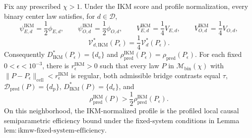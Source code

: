Fix any prescribed \(\chi>1\). Under the IKM score and profile normalization, every binary center law satisfies, for \(d\in\mathcal D\),
\[
 \psi_{E,d}^{\mathrm{IKM}}=\frac12\phi_{E,d},
 \qquad
 \psi_{O,d}^{\mathrm{IKM}}=\frac12\phi_{O,d},
 \qquad
 V_{E,d}^{\mathrm{IKM}}=\frac14V_{E,d},
 \qquad
 V_{O,d}^{\mathrm{IKM}}=\frac14V_{O,d},
\]
\[
 \mathcal V_{d,\mathrm{IKM}}^*(P_\epsilon)
 =\frac14\mathcal V_d^*(P_\epsilon).
\]
Consequently \(D_{\mathrm{IKM}}^*(P_\epsilon)=\{d_{\mathrm e}\}\) and \(\rho_{\mathrm{pred}}^{\mathrm{IKM}}(P_\epsilon)=\rho_{\mathrm{pred}}(P_\epsilon)\). For each fixed \(0<\epsilon<10^{-3}\), there is \(r_\epsilon^{\mathrm{IKM}}>0\) such that every law \(P\) in \(\mathcal M_{\mathrm{bin}}(\chi)\) with \(\|P-P_\epsilon\|_{\mathrm{cell}}<r_\epsilon^{\mathrm{IKM}}\) is regular, both admissible bridge contrasts equal \(\tau\), \(\mathcal D_{\mathrm{pred}}(P)=\{d_{\mathrm p}\}\), \(D_{\mathrm{IKM}}^*(P)=\{d_{\mathrm e}\}\), and
\[
 \rho_{\mathrm{pred}}^{\mathrm{IKM}}(P)
 >\frac12\rho_{\mathrm{pred}}^{\mathrm{IKM}}(P_\epsilon).
\]
On this neighborhood, the IKM-normalized profile is the profiled local causal semiparametric efficiency bound under the fixed-system conditions in Lemma~\(\mathrm{lem{:}ikmw\text{-}fixed\text{-}system\text{-}efficiency}\).